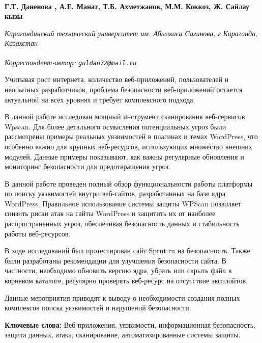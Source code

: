 
\begin{articleheader}

{\bfseries
Г.Т. Даненова\textsuperscript{\envelope } \authorid,
А.Е. Манат\authorid,
Т.Б. Ахметжанов\authorid,
М.М. Коккоз\authorid,
Ж. Сайлау кызы\authorid}
\end{articleheader}

\begin{affiliation}
\emph{Карагандинский технический университет им. Абылкаса Сагинова, г.Караганда, Казахстан}

\raggedright \textsuperscript{\envelope }{\em Корреспондент-автор: \href{mailto:guldan72@mail.ru}{\nolinkurl{guldan72@mail.ru}}}
\end{affiliation}

Учитывая рост интернета, количество веб-приложений, пользователей и
неопытных разработчиков, проблема безопасности веб-приложений остается
актуальной на всех уровнях и требует комплексного подхода.

В данной работе исследован мощный инструмент сканирования веб-сервисов
Wpscan. Для более детального осмысления потенциальных угроз были
рассмотрены примеры реальных уязвимостей в плагинах и темах WordPress,
что особенно важно для крупных веб-ресурсов, использующих множество
внешних модулей. Данные примеры показывают, как важны регулярные
обновления и мониторинг безопасности для предотвращения угроз.

В данной работе проведен полный обзор функциональности работы платформы
по поиску уязвимостей внутри веб-сайтов, разработанных на базе ядра
WordPress. Правильное использование системы защиты WPScan позволяет
снизить риски атак на сайты WordPress и защитить их от наиболее
распространенных угроз, обеспечивая безопасность данных и стабильность
работы веб-ресурсов.

В ходе исследований был протестирован сайт Sprut.ru на безопасность.
Также были разработаны рекомендации для улучшения безопасности сайта. В
частности, необходимо обновить версию ядра, убрать или скрыть файл в
корневом каталоге, регулярно проверять веб-ресурс на отсутствие
эксплойтов.

Данные мероприятия приводят к выводу о необходимости создания полных
комплексов поиска уязвимостей и нарушений безопасности.

{\bfseries Ключевые слова:} Веб-приложения, уязвимости, информационная безопасность,
защита данных, атака, сканирование, автоматизированные системы защиты.

